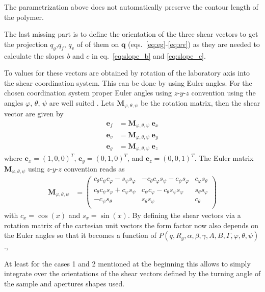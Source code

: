 The parametrization above does not automatically preserve the contour length of the polymer.

The last missing part is to define the orientation of the three shear vectors to get the projection $q_g$,$q_f$, $q_v$ of of them on $\mathbf{q}$ (eqs.\ \ref{eq:eg}-\ref{eq:ev}) as they are needed to calculate the slopes $b$ and $c$ in eq.\ \ref{eq:slope_b} and \ref{eq:slope_c}.

To values for these vectors are obtained by rotation of the laboratory axis into the shear coordination system. This can be done by using Euler angles. For the chosen coordination system proper Euler angles using $z$-$y$-$z$ convention using the angles $\varphi$, $\theta$, $\psi$ are well suited \cite{reference.wolfram_2022_eulerangles}. Lets $\mathbf{M}_{\varphi,\theta,\psi}$ be the rotation matrix, then the shear vector are given by
\begin{align}\label{eq:rotated_shear_vectors}
  \mathbf{e}_f &= \mathbf{M}_{\varphi,\theta,\psi} \; \mathbf{e}_x \\
  \mathbf{e}_v &= \mathbf{M}_{\varphi,\theta,\psi} \; \mathbf{e}_y \\
  \mathbf{e}_g &= \mathbf{M}_{\varphi,\theta,\psi} \; \mathbf{e}_z
\end{align}
where $\mathbf{e}_x=(1,0,0)^T$, $\mathbf{e}_y=(0,1,0)^T$, and $\mathbf{e}_z=(0,0,1)^T$. The Euler matrix $\mathbf{M}_{\varphi,\theta,\psi}$ using $z$-$y$-$z$ convention reads as
\begin{align}
\mathbf{M}_{\varphi,\theta,\psi} &=
\left(
\begin{array}{ccc}
 c_{\theta } c_{\psi } c_{\varphi }-s_{\psi } s_{\varphi } & -c_{\theta } c_{\varphi } s_{\psi }-c_{\psi } s_{\varphi } & c_{\varphi } s_{\theta } \\
 c_{\theta } c_{\psi } s_{\varphi }+c_{\varphi } s_{\psi } & c_{\psi } c_{\varphi }-c_{\theta } s_{\psi } s_{\varphi } & s_{\theta } s_{\varphi } \\
 -c_{\psi } s_{\theta } & s_{\theta } s_{\psi } & c_{\theta } \\
\end{array}
\right)
\end{align}
with $c_x=\cos(x)$ and $s_x=\sin(x)$.
By defining the shear vectors via a rotation matrix of the cartesian unit vectors the form factor now also depends on the Euler angles so that it becomes a function of $P(q,R_g,\alpha,\beta,\gamma,A,B,\mathit{\Gamma},\varphi,\theta,\psi)$.,

At least for the cases 1 and 2 mentioned at the beginning this allows to simply integrate over the orientations of the shear vectors defined by the turning angle of the sample and apertures shapes used.

